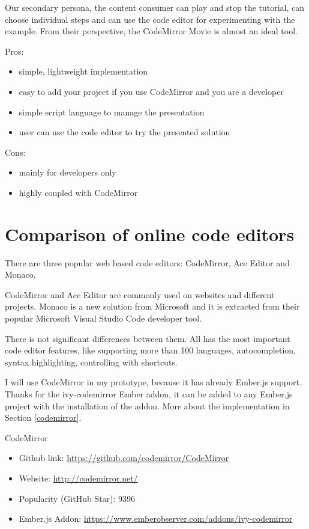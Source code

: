\documentclass[11pt, a4paper, oneside, openright, medskipamount]{report}
\begin{document}
Our secondary persona, the content consumer can play and stop the tutorial, can choose individual steps and can use the code editor for experimenting with the example. From their perspective, the CodeMirror Movie is almost an ideal tool.

\noindent Pros:
\begin{itemize}[noitemsep]
\item simple, lightweight implementation
\item easy to add your project if you use CodeMirror and you are a developer
\item simple script language to manage the presentation
\item user can use the code editor to try the presented solution
\end{itemize}
Cons:
\begin{itemize}[noitemsep]
\item mainly for developers only
\item highly coupled with CodeMirror
\end{itemize}

\section{Comparison of online code editors} \label{comparison}

There are three popular web based code editors: CodeMirror, Ace Editor and Monaco.

CodeMirror and Ace Editor are commonly used on websites and different projects. Monaco is a new solution from Microsoft and it is extracted from their popular Microsoft Visual Studio Code developer tool.

There is not significant differences between them. All has the most important code editor features, like supporting more than 100 languages, autocompletion, syntax highlighting, controlling with shortcuts.

I will use CodeMirror in my prototype, because it has already Ember.js support. Thanks for the ivy-codemirror Ember addon, it can be added to any Ember.js project with the installation of the addon. More about the implementation in Section \ref{codemirror}.

\noindent CodeMirror
\begin{itemize}[noitemsep]
\item Github link: \url{https://github.com/codemirror/CodeMirror}
\item Website: \url{http://codemirror.net/}
\item Popularity (GitHub Star): 9396
\item Ember.js Addon: \url{https://www.emberobserver.com/addons/ivy-codemirror}
\end{itemize}
\end{document}
